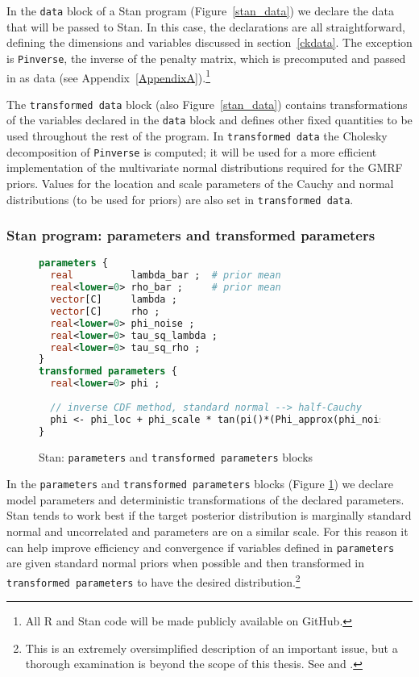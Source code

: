 In the {\tt data} block of a Stan program (Figure~\ref{stan_data}) we declare the data that will be passed to Stan. In this case, the declarations are all straightforward, defining the dimensions and variables discussed in section~\ref{ckdata}. The exception is {\tt Pinverse}, the inverse of the penalty matrix, which is precomputed and passed in as data (see Appendix~\ref{AppendixA}).\footnote{All R and Stan code will be made publicly available on GitHub.}

The {\tt transformed data} block (also Figure~\ref{stan_data}) contains transformations of the variables declared in the {\tt data} block and defines other fixed quantities to be used throughout the rest of the program. In {\tt transformed data} the Cholesky decomposition of {\tt Pinverse} is computed; it will be used for a more efficient implementation of the multivariate normal distributions required for the GMRF priors. Values for the location and scale parameters of the Cauchy and normal distributions (to be used for priors) are also set in {\tt transformed data}. 


\subsubsection{Stan program: parameters and transformed parameters}

\begin{figure}[t]
\begin{lstlisting}[language=Stan, frame=trBL]
parameters {
  real          lambda_bar ;  # prior mean 
  real<lower=0> rho_bar ;     # prior mean 
  vector[C]     lambda ;      
  vector[C]     rho ;
  real<lower=0> phi_noise ;    
  real<lower=0> tau_sq_lambda ;  
  real<lower=0> tau_sq_rho ;
}
transformed parameters {
  real<lower=0> phi ;
  
  // inverse CDF method, standard normal --> half-Cauchy
  phi <- phi_loc + phi_scale * tan(pi()*(Phi_approx(phi_noise) - 0.5)) ;
}
\end{lstlisting}
\caption{Stan: {\tt parameters} and {\tt transformed parameters} blocks}
\label{stan_parameters}
\end{figure}

In the {\tt parameters} and {\tt transformed parameters} blocks (Figure \ref{stan_parameters}) we declare model parameters and deterministic transformations of the declared parameters. Stan tends to work best if the target posterior distribution is marginally standard normal and uncorrelated and parameters are on a similar scale. For this reason it can help improve efficiency and convergence if variables defined in {\tt parameters} are given standard normal priors when possible and then transformed in {\tt transformed parameters} to have the desired distribution.\footnote{This is an extremely oversimplified description of an important issue, but a thorough examination is beyond the scope of this thesis. See  and .} 

